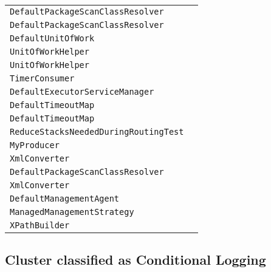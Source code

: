 \begin{center}
\begin{tabular}{ll}
\lstinline/DefaultPackageScanClassResolver/&\raisebox{0pt}{\lstinline/find(PackageScanFilter,String,ClassLoader,Set<Class<?>>)/}\\
\lstinline/DefaultPackageScanClassResolver/&\raisebox{0pt}{\lstinline/DefaultPackageScanClassResolver()/}\\
\lstinline/DefaultUnitOfWork/&\raisebox{0pt}{\lstinline/done(Exchange)/}\\
\lstinline/UnitOfWorkHelper/&\raisebox{0pt}{\lstinline/beforeRouteSynchronizations(Route,Exchange,List<Synchronization>,Logger)/}\\
\lstinline/UnitOfWorkHelper/&\raisebox{0pt}{\lstinline/afterRouteSynchronizations(Route,Exchange,List<Synchronization>,Logger)/}\\
\lstinline/TimerConsumer/&\raisebox{0pt}{\lstinline/run()/}\\
\lstinline/DefaultExecutorServiceManager/&\raisebox{0pt}{\lstinline/doShutdown(ExecutorService,long,boolean)/}\\
\lstinline/DefaultTimeoutMap/&\raisebox{0pt}{\lstinline/run()/}\\
\lstinline/DefaultTimeoutMap/&\raisebox{0pt}{\lstinline/purge()/}\\
\lstinline/ReduceStacksNeededDuringRoutingTest/&\raisebox{0pt}{\lstinline/process(Exchange)/}\\
\lstinline/MyProducer/&\raisebox{0pt}{\lstinline/process(Exchange,AsyncCall)/}\\
\lstinline/XmlConverter/&\raisebox{0pt}{\lstinline/toSAXSourceFromStream(StreamSource,Exchange)/}\\
\lstinline/DefaultPackageScanClassResolver/&\raisebox{0pt}{\lstinline/doLoadJarClassEntries(InputStream,String)/}\\
\lstinline/XmlConverter/&\raisebox{0pt}{\lstinline/createDocumentBuilderFactory()/}\\
\lstinline/DefaultManagementAgent/&\raisebox{0pt}{\lstinline/createMBeanServer()/}\\
\lstinline/ManagedManagementStrategy/&\raisebox{0pt}{\lstinline/isManaged(Object,Object)/}\\
\lstinline/XPathBuilder/&\raisebox{0pt}{\lstinline/logNamespaces(Exchange)/}\\
\bottomrule
\end{tabular}
\end{center}


\subsection{Cluster classified as Conditional Logging}

